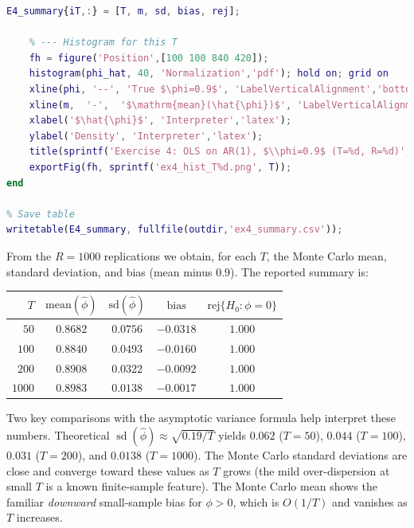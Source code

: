 \documentclass[dvipsnames,11pt]{article}
\begin{document}
\begin{solution}
\begin{lstlisting}[language=Matlab]
    E4_summary{iT,:} = [T, m, sd, bias, rej];

    % --- Histogram for this T
    fh = figure('Position',[100 100 840 420]);
    histogram(phi_hat, 40, 'Normalization','pdf'); hold on; grid on
    xline(phi, '--', 'True $\phi=0.9$', 'LabelVerticalAlignment','bottom', 'Interpreter','latex');
    xline(m,  '-',  '$\mathrm{mean}(\hat{\phi})$', 'LabelVerticalAlignment','bottom', 'Interpreter','latex');
    xlabel('$\hat{\phi}$', 'Interpreter','latex'); 
    ylabel('Density', 'Interpreter','latex');
    title(sprintf('Exercise 4: OLS on AR(1), $\\phi=0.9$ (T=%d, R=%d)', T, R), 'Interpreter','latex');
    exportFig(fh, sprintf('ex4_hist_T%d.png', T));
end

% Save table
writetable(E4_summary, fullfile(outdir,'ex4_summary.csv'));
\end{lstlisting}

        From the $R=1000$ replications we obtain, for each $T$, the Monte Carlo mean, standard deviation, and bias (mean minus $0.9$). The reported summary is:
        
        \begin{center}
            \begin{tabular}{rcccc}
                \toprule
                $T$ & $\mathrm{mean}(\widehat\phi)$ & $\mathrm{sd}(\widehat\phi)$ & $\mathrm{bias}$ & $\mathrm{rej}\{H_0\!:\phi=0\}$ \\
                \midrule
                $50$   & $0.8682$ & $0.0756$ & $-0.0318$ & $1.000$\\
                $100$  & $0.8840$ & $0.0493$ & $-0.0160$ & $1.000$\\
                $200$  & $0.8908$ & $0.0322$ & $-0.0092$ & $1.000$\\
                $1000$ & $0.8983$ & $0.0138$ & $-0.0017$ & $1.000$\\
                \bottomrule
            \end{tabular}
        \end{center}
        
        Two key comparisons with the asymptotic variance formula help interpret these numbers. Theoretical $\operatorname{sd}(\widehat\phi)\approx\sqrt{0.19/T}$ yields $0.062$ ($T{=}50$), $0.044$ ($T{=}100$), $0.031$ ($T{=}200$), and $0.0138$ ($T{=}1000$). The Monte Carlo standard deviations are close and converge toward these values as $T$ grows (the mild over-dispersion at small $T$ is a known finite-sample feature). The Monte Carlo mean shows the familiar \emph{downward} small-sample bias for $\phi>0$, which is $O(1/T)$ and vanishes as $T$ increases.


\end{solution}
\end{document}
